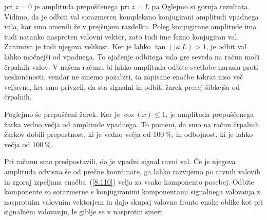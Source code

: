 pri $z=0$ je 
amplituda prepuščenega pri $z = L$ pa
Oglejmo si gornja rezultata. Vidimo, da je odbiti val sorazmeren 
kompleksno konjugirani amplitudi vpadnega vala, kar smo omenili že v prejšnjem
razdelku. Poleg konjugirane amplitude ima tudi natanko nasproten valovni vektor, 
zato tudi ime fazno konjugiran val. Zanimiva je tudi njegova velikost. Ker 
je lahko $\tan\left(|\kappa|L\right)>1$, je odbit val lahko močnejši od vpadnega.
To ojačenje odbitega vala gre seveda na račun moči črpalnih
valov. V našem računu bi lahko amplituda odbite svetlobe narasla proti neskončnosti, 
vendar ne smemo pozabiti, ta zapisane enačbe takrat niso več veljavne, ker smo privzeli, 
da sta signalni in odbiti žarek precej šibkejša od črpalnih.

Poglejmo še prepuščeni žarek. Ker je $\cos(x)\leq1$, je amplituda prepuščenega
žarka vedno večja od amplitude vpadnega. To pomeni, da smo na račun črpalnih žarkov
dobili prepustnost, ki je vedno večja od $100~\%$, in odbojnost, ki je lahko 
večja od $100~\%$.

Pri računu smo predpostavili, da je vpadni signal ravni val. Če je njegova
amplituda odvisna še od prečne koordinate, ga lahko razvijemo po ravnih
valovih in zgoraj izpeljana enačba~(\ref{8.110}) velja za vsako komponento posebej. 
Odbite komponente so sorazmerne s konjugiranimi komponentami signalnega valovanja
z nasprotnim valovnim vektorjem in dajo skupaj valovno fronto enake
oblike kot pri signalnem valovanju, le giblje se v nasprotni smeri.